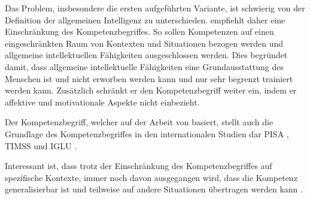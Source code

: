 Das Problem, insbesondere die ersten aufgeführten Variante, ist schwierig von der Definition der allgemeinen Intelligenz zu unterschieden. \citet{Weinert2001b} empfiehlt daher eine Einschränkung des Kompetenzbegriffes. So sollen Kompetenzen auf einen eingeschränkten Raum von Kontexten und Situationen bezogen werden und allgemeine intellektuellen Fähigkeiten ausgeschlossen werden. Dies begründet \citet{Weinert2001b} damit, dass allgemeine intellektuelle Fähigkeiten eine Grundausstattung des Menschen ist und nicht erworben werden kann und nur sehr begrenzt trainiert werden kann. Zusätzlich schränkt er den Kompetenzbegriff weiter ein, indem er affektive und motivationale Aspekte nicht einbezieht.

Der Kompetenzbegriff, welcher auf der Arbeit von \citet{Klieme2004, Weinert2001b} basiert, stellt auch die Grundlage des Kompetenzbegriffes in den internationalen Studien dar PISA \citep{PISA-KonsortiumDeuschland2004}, TIMSS \citep{Martin2003} und IGLU \citep{Bos2003}.

Interessant ist, dass trotz der Einschränkung des Kompetenzbegriffes auf spezifische Kontexte, immer noch davon ausgegangen wird, dass die Kompetenz generalisierbar ist und teilweise auf andere Situationen übertragen werden kann \citet{Hartig2006}.


